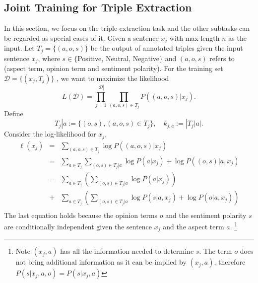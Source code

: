 \documentclass[letterpaper]{article} \usepackage{aaai21}  \usepackage{times}  \usepackage{helvet} \usepackage{courier}  \usepackage[hyphens]{url}  \usepackage{graphicx} \urlstyle{rm} \def\UrlFont{\rm}  \usepackage{natbib}  \usepackage{caption}
\begin{document}
\subsection{Joint Training for Triple Extraction}
In this section, we focus on the triple extraction task and the other subtasks can be regarded as special cases of it.
Given a sentence $x_j$ with max-length $n$ as the input. 
Let $T_j=\{(a,o,s)\}$  be the output of annotated triples given the input sentence $x_j$, where 
$s \in \{$Positive, Neutral, Negative$\}$ and $(a,o,s)$ refers to (aspect term, opinion term and sentiment polarity). 
For the training set $\mathcal{D} = \{(x_j, T_j) \}$ , we want to maximize the likelihood 
\begin{equation}
    L(\mathcal{D}) =   \prod_{j=1}^{|\mathcal{D}|}\prod_{(a,o,s) \in T_j} P((a,o,s)|x_j).
\end{equation}
Define 
\begin{equation}
T_j|a :=\{(o,s), (a,o,s) \in T_j \}, \quad k_{j, a} := |T_j|a|.
\end{equation}
Consider the log-likelihood for $x_j$,
\begin{eqnarray}
    \ell(x_j)&=& \sum_{(a,o,s) \in T_j} \log P((a,o,s)|x_j) \nonumber \\
    &=& \sum_{a \in T_j} \sum_{(o,s) \in T_j|a}  \log P(a|x_j) + \log P((o,s)|a, x_j)\nonumber \\
    &=& \sum_{a \in T_j} \left( \sum_{(o,s) \in T_j|a}  \log P(a|x_j) \right) \nonumber\\
    &+&  \sum_{a \in T_j} \left(\sum_{(o,s) \in T_j|a}  \log P(s|a, x_j) + \log P(o|a, x_j) \right)  \nonumber\\
    \end{eqnarray}
The last equation holds because the opinion terms $o$ and the sentiment polarity $s$ are conditionally independent  
given the sentence $x_j$ and the aspect term $a$.
\footnote{Note $(x_j, a)$ has all the information needed to determine $s$. The term $o$ does not bring additional information as it can be implied by $(x_j, a)$,
therefore $P(s|x_j,a,o)=P(s|x_j,a)$}
\end{document}
